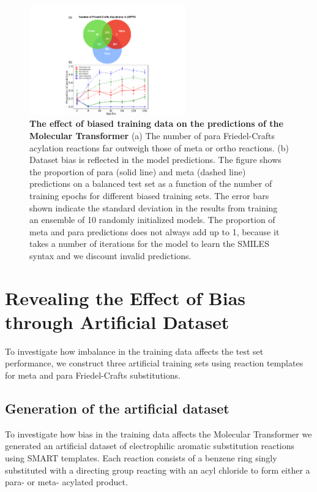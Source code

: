 \begin{figure}[htbp!] 
    \centering    
    \includegraphics[width=0.6\textwidth]{Chapters/Transformer/Figs/venn_toy.pdf}
    \caption{ \textbf{The effect of biased training data on the predictions of the Molecular Transformer} (a) The number of para Friedel-Crafts acylation reactions far outweigh those of meta or ortho reactions. (b) Dataset bias is reflected in the model predictions. The figure shows the proportion of para (solid line) and meta (dashed line) predictions on a balanced test set as a function of the number of training epochs for different biased training sets. The error bars shown indicate the standard deviation in the results from training an ensemble of 10 randomly initialized models. The proportion of meta and para predictions does not always add up to 1, because it takes a number of iterations for the model to learn the SMILES syntax and we discount invalid predictions.}
    \label{fig:venn_toy}
\end{figure}

\section{Revealing the Effect of Bias through Artificial Dataset}

To investigate how imbalance in the training data affects the test set performance, we construct three artificial training sets using reaction templates for meta and para Friedel-Crafts substitutions. 

\subsection*{Generation of the artificial dataset}
To investigate how bias in the training data affects the Molecular Transformer we generated an artificial dataset of electrophilic aromatic substitution reactions using SMART templates. Each reaction consists of a benzene ring singly substituted with a directing group reacting with an acyl chloride to form either a para- or meta- acylated product. 

